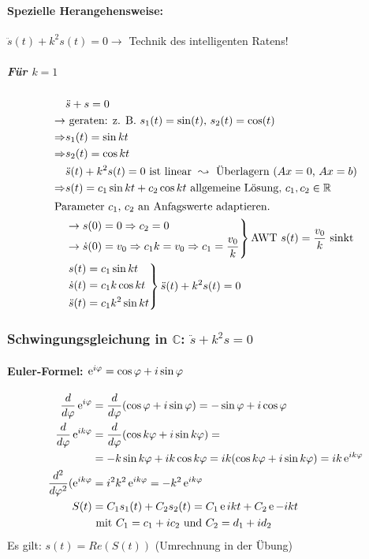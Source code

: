 \paragraph{Spezielle Herangehensweise:} $\ddot s(t) + k^2s(t) = 0 \rightarrow$ Technik des intelligenten Ratens!

\subparagraph{Für $k = 1$}
\begin{align*}
	& \ddot s + s = 0 \\
	\rightarrow &\text{ geraten: z. B. $s_1(t) = \sin(t)$, $s_2(t) = \cos(t)$}\\
	\Rightarrow &s_1(t) = \sin kt \\
	\Rightarrow &s_2(t) = \cos kt \\
	& \ddot s(t) + k^2s(t) = 0 \text { ist linear } \leadsto \text{ Überlagern ($Ax = 0$, $Ax = b$)} \\
	\Rightarrow &s(t) = c_1 \sin kt + c_2 \cos kt \text{ allgemeine Lösung, $c_1, c_2 \in \mathbb{R}$} \\
	\intertext{Parameter $c_1$, $c_2$ an Anfagswerte adaptieren.}
	&\left. \begin{aligned}
		\rightarrow s(0) &= 0 \Rightarrow c_2 = 0 \\
		\rightarrow \dot s(0) &= v_0 \Rightarrow c_1k = v_0 \Rightarrow c_1 = \frac{v_0}{k}
	\end{aligned} \right\} \text {AWT $s(t) = \frac{v_0}{k}$ sinkt} \\
	&\left. \begin{aligned}
		s(t) &= c_1 \sin kt \\
		\dot s(t) &= c_1k \cos kt \\
		\ddot s(t) &= c_1k^2 \sin kt
	\end{aligned} \right\}\ddot s(t) + k^2s(t) = 0
\end{align*}

\subsubsection{Schwingungsgleichung in $\mathbb{C}$: $\ddot s + k^2s = 0$}

\paragraph{Euler-Formel: $\operatorname{e}^{i\varphi} = \cos \varphi + i \sin \varphi$}
\begin{align*}
	\frac{d}{d\varphi}\operatorname{e}^{i\varphi} &= \frac{d}{d\varphi}(\cos \varphi + i \sin \varphi) = -\sin \varphi + i\cos \varphi \\
	\frac{d}{d\varphi}\operatorname{e}^{ik\varphi} &= \frac{d}{d\varphi}(\cos k\varphi + i \sin k\varphi) =\\ &= -k\sin k\varphi + ik\cos k\varphi = ik(\cos k\varphi + i\sin k\varphi) = ik\operatorname{e}^{ik\varphi} \\
	\frac{d^2}{d\varphi^2}(\operatorname{e}^{ik\varphi} &= i^2k^2\operatorname{e}^{ik\varphi} = -k^2 \operatorname{e}^{ik\varphi} \\
	S(t) &= C_1s_1(t) + C_2s_2(t) = C_1\operatorname{e}{ikt} + C_2\operatorname{e}{-ikt} \\&\text{ mit $C_1 = c_1 + ic_2$ und $C_2 = d_1 + id_2$}
\end{align*}
Es gilt: $s(t) = Re(S(t))$ (Umrechnung in der Übung)

